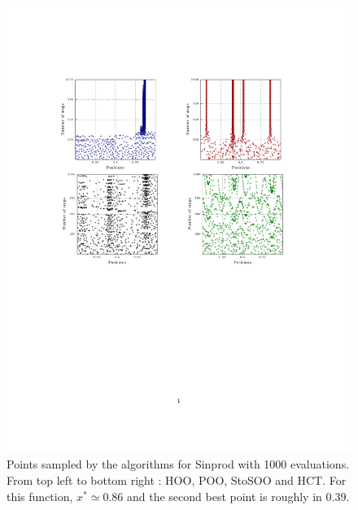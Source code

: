 \documentclass[a4paper,10pt]{article}
\begin{document}
\begin{figure}
\label{fig:position1000}
\hspace{-5cm}\includegraphics[trim = {0 6cm 0 4cm},clip]{marginal1000.pdf}
\vspace{-4cm}
  \caption{Points sampled by the algorithms for Sinprod with 1000 evaluations. From top left to bottom right : HOO, POO, StoSOO and HCT. For this function, $x^*\simeq 0.86$ and the second best point is roughly in $0.39$.}
\end{figure}
\end{document}
